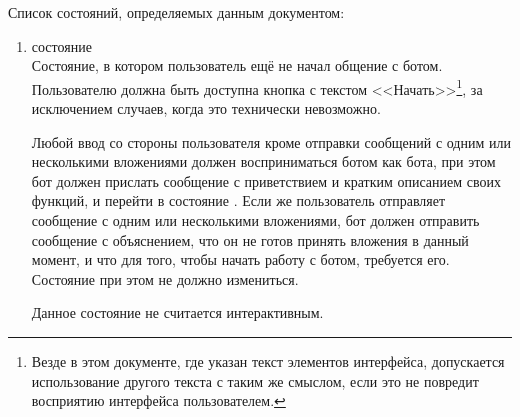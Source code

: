     Список состояний, определяемых данным документом:
    \begin{enumerate}
        \item \label{itm:req:ui:states:init}
             состояние \\
            Состояние, в котором пользователь ещё не начал общение с ботом.
            Пользователю должна быть доступна кнопка с текстом <<Начать>>\footnote{
            Везде в этом документе, где указан текст элементов интерфейса, допускается
            использование другого текста с таким же смыслом, если это не повредит восприятию
            интерфейса пользователем.}, за исключением случаев, когда это технически невозможно.

            Любой ввод со стороны пользователя кроме отправки сообщений с одним или несколькими
            вложениями должен восприниматься ботом как  бота, при этом бот должен прислать
            сообщение с приветствием и кратким описанием своих функций, и перейти в состояние
            \hyperref[itm:req:ui:states:mainmenu]{}.
            Если же пользователь отправляет сообщение с одним или несколькими
            вложениями, бот должен отправить сообщение с объяснением, что он не готов принять вложения
            в данный момент, и что для того, чтобы начать работу с ботом, требуется 
            его. Состояние при этом не должно измениться.

            Данное состояние не считается интерактивным.


\end{enumerate}
